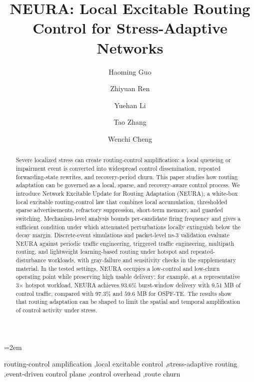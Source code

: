 \documentclass[5p,times]{elsarticle}
\begin{document}
\emergencystretch=2em
\begin{frontmatter}

\title{NEURA: Local Excitable Routing Control for Stress-Adaptive Networks}



\author[zky]{Haoming Guo}
\author[xidian]{Zhiyuan Ren}
\author[xidian]{Yuehan Li}
\author[xidian]{Tao Zhang}
\author[xidian]{Wenchi Cheng}

\address[zky]{Institute of Software, Chinese Academy of Sciences, 4 South Fourth Street, Zhong Guan Cun, Beijing 100190, China}
\address[xidian]{School of Telecommunications Engineering, Xidian University, Xi'an 710071, China}

\begin{abstract}
Severe localized stress can create routing-control amplification: a local queueing or impairment event is converted into widespread control dissemination, repeated forwarding-state rewrites, and recovery-period churn. This paper studies how routing adaptation can be governed as a local, sparse, and recovery-aware control process. We introduce Network Excitable Update for Routing Adaptation (NEURA), a white-box local excitable routing-control law that combines local accumulation, thresholded sparse advertisements, refractory suppression, short-term memory, and guarded switching. Mechanism-level analysis bounds per-candidate firing frequency and gives a sufficient condition under which attenuated perturbations locally extinguish below the decay margin. Discrete-event simulations and packet-level ns-3 validation evaluate NEURA against periodic traffic engineering, triggered traffic engineering, multipath routing, and lightweight learning-based routing under hotspot and repeated-disturbance workloads, with gray-failure and sensitivity checks in the supplementary material. In the tested settings, NEURA occupies a low-control and low-churn operating point while preserving high usable delivery; for example, at a representative 3$\times$ hotspot workload, NEURA achieves $93.6\%$ burst-window delivery with $9.51$ MB of control traffic, compared with $97.3\%$ and $59.6$ MB for OSPF-TE. The results show that routing adaptation can be shaped to limit the spatial and temporal amplification of control activity under stress.
\end{abstract}

\begin{keyword}
routing-control amplification \sep local excitable control \sep stress-adaptive routing \sep event-driven control plane \sep control overhead \sep route churn
\end{keyword}

\end{frontmatter}
\end{document}
